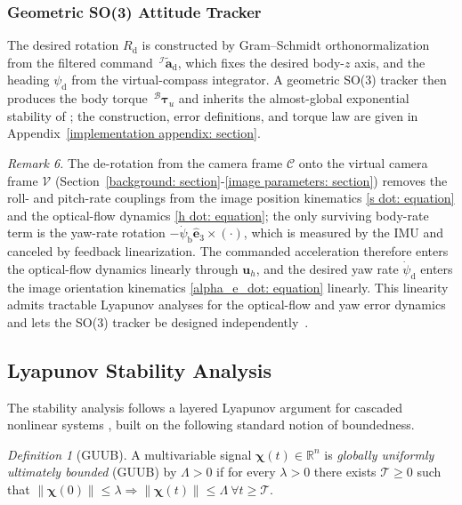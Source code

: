 \documentclass{IEEEtaes}
\begin{document}
\subsubsection{Geometric SO(3) Attitude Tracker} \label{so3 inner loop: section}
The desired rotation $R_\text{d}$ is constructed by Gram--Schmidt orthonormalization from the filtered command $\,^\mathcal{I}\tilde{\boldsymbol{a}}_\text{d}$, which fixes the desired body-$z$ axis, and the heading $\psi_\text{d}$ from the virtual-compass integrator. A geometric SO(3) tracker then produces the body torque $\,^\mathcal{B}\boldsymbol{\tau}_u$ and inherits the almost-global exponential stability of \cite[Thm.~3.1]{lee2010}; the construction, error definitions, and torque law are given in Appendix~\ref{implementation appendix: section}.

\textit{Remark 6.} The de-rotation from the camera frame $\mathcal{C}$ onto the virtual camera frame $\mathcal{V}$ (Section~\ref{background: section}-\ref{image parameters: section}) removes the roll- and pitch-rate couplings from the image position kinematics \eqref{s dot: equation} and the optical-flow dynamics \eqref{h dot: equation}; the only surviving body-rate term is the yaw-rate rotation $-\dot{\psi}_\text{b}\hat{\boldsymbol{e}}_3\times(\cdot)$, which is measured by the IMU and canceled by feedback linearization. The commanded acceleration therefore enters the optical-flow dynamics linearly through $\boldsymbol{u}_h$, and the desired yaw rate $\dot{\psi}_\text{d}$ enters the image orientation kinematics \eqref{alpha_e_dot: equation} linearly. This linearity admits tractable Lyapunov analyses for the optical-flow and yaw error dynamics and lets the SO(3) tracker be designed independently~\cite{fink2017, xie2016_2}.

\subsection{Lyapunov Stability Analysis} \label{stability: section}
The stability analysis follows a layered Lyapunov argument for cascaded nonlinear systems \cite{khalil2002}, built on the following standard notion of boundedness.

\textit{Definition 1} (GUUB). A multivariable signal $\boldsymbol{\chi}(t)\in\mathbb{R}^n$ is \emph{globally uniformly ultimately bounded} (GUUB) by $\Lambda>0$ if for every $\lambda>0$ there exists $\mathcal{T}\ge 0$ such that $\|\boldsymbol{\chi}(0)\|\le\lambda\Rightarrow\|\boldsymbol{\chi}(t)\|\le\Lambda\ \forall t\ge\mathcal{T}$.
\end{document}
